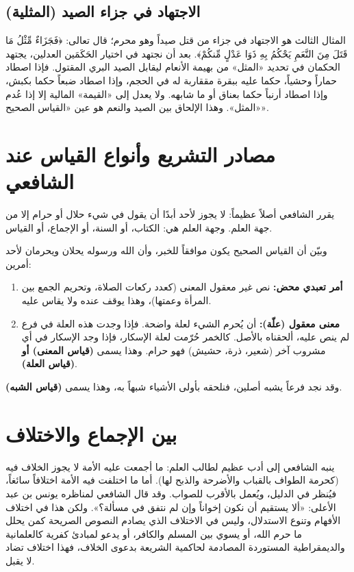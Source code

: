 \subsection{الاجتهاد في جزاء الصيد (المثلية)}
المثال الثالث هو الاجتهاد في جزاء من قتل صيداً وهو محرم؛ قال تعالى: ﴿فَجَزَاءٌ مِّثْلُ مَا قَتَلَ مِنَ النَّعَمِ يَحْكُمُ بِهِ ذَوَا عَدْلٍ مِّنكُمْ﴾. بعد أن نجتهد في اختيار الحَكَمَين العدلين، يجتهد الحكمان في تحديد «المثل» من بهيمة الأنعام ليقابل الصيد البري المقتول. فإذا اصطاد حماراً وحشياً، حكما عليه ببقرة مققاربة له في الحجم، وإذا اصطاد ضبعاً حكما بكبش، وإذا اصطاد أرنباً حكما بعناق أو ما شابهه. ولا يعدل إلى «القيمة» المالية إلا إذا عُدم «المثل». وهذا الإلحاق بين الصيد والنعم هو عين «القياس الصحيح».

\section{مصادر التشريع وأنواع القياس عند الشافعي}
يقرر الشافعي أصلاً عظيماً: لا يجوز لأحد أبدًا أن يقول في شيء حلال أو حرام إلا من جهة العلم. وجهة العلم هي: الكتاب، أو السنة، أو الإجماع، أو القياس.

وبيّن أن القياس الصحيح يكون موافقاً للخبر، وأن الله ورسوله يحلان ويحرمان لأحد أمرين:
\begin{enumerate}
    \item \textbf{أمر تعبدي محض:} نص غير معقول المعنى (كعدد ركعات الصلاة، وتحريم الجمع بين المرأة وعمتها)، وهذا يوقف عنده ولا يقاس عليه.
    \item \textbf{معنى معقول (علّة):} أن يُحرم الشيء لعلة واضحة. فإذا وجدت هذه العلة في فرع لم ينص عليه، ألحقناه بالأصل. كالخمر حُرّمت لعلة الإسكار، فإذا وجد الإسكار في أي مشروب آخر (شعير، ذرة، حشيش) فهو حرام. وهذا يسمى \textbf{(قياس المعنى) أو (قياس العلة)}.
\end{enumerate}
وقد نجد فرعاً يشبه أصلين، فنلحقه بأولى الأشياء شبهاً به، وهذا يسمى \textbf{(قياس الشبه)}.

\section{بين الإجماع والاختلاف}
ينبه الشافعي إلى أدب عظيم لطالب العلم: ما أجمعت عليه الأمة لا يجوز الخلاف فيه (كحرمة الطواف بالقباب والأضرحة والذبح لها). أما ما اختلفت فيه الأمة اختلافاً سائغاً، فيُنظر في الدليل، ويُعمل بالأقرب للصواب. وقد قال الشافعي لمناظره يونس بن عبد الأعلى: «ألا يستقيم أن نكون إخواناً وإن لم نتفق في مسألة؟».
ولكن هذا في اختلاف الأفهام وتنوع الاستدلال، وليس في الاختلاف الذي يصادم النصوص الصريحة كمن يحلل ما حرم الله، أو يسوي بين المسلم والكافر، أو يدعو لمبادئ كفرية كالعلمانية والديمقراطية المستوردة المصادمة لحاكمية الشريعة بدعوى الخلاف، فهذا اختلاف تضاد لا يقبل.

